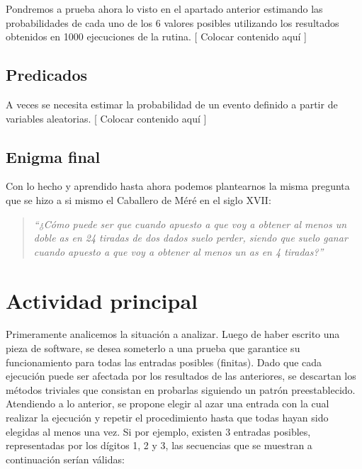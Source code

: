 \documentclass{article}
\begin{document}
Pondremos a prueba ahora lo visto en el apartado anterior estimando las probabilidades de cada uno de los 6 valores posibles utilizando los resultados obtenidos en 1000 ejecuciones de la rutina. [ Colocar contenido aquí ]


\subsection{Predicados}

A veces se necesita estimar la probabilidad de un evento definido a partir de variables aleatorias. [ Colocar contenido aquí ]


\subsection{Enigma final}

Con lo hecho y aprendido hasta ahora podemos plantearnos la misma pregunta que se hizo a si mismo el Caballero de Méré en el siglo XVII: 

\begin{quotation}
\em``¿Cómo puede ser que cuando apuesto a que voy a obtener al menos un doble as en 24 tiradas de dos dados suelo perder, siendo que suelo ganar cuando apuesto a que voy a obtener al menos un as en 4 tiradas?''
\end{quotation}




\section{Actividad principal}

	Primeramente analicemos la situación a analizar. Luego de haber escrito una pieza de software, se desea someterlo a una prueba que garantice su funcionamiento para todas las entradas posibles (finitas). Dado que cada ejecución puede ser afectada por los resultados de las anteriores, se descartan los métodos triviales que consistan en probarlas siguiendo un patrón preestablecido.
	Atendiendo a lo anterior, se propone elegir al azar una entrada con la cual realizar la ejecución y repetir el procedimiento hasta que todas hayan sido elegidas al menos una vez. Si por ejemplo, existen 3 entradas posibles, representadas por los dígitos 1, 2 y 3, las secuencias que se muestran a continuación serían válidas:
\end{document}
